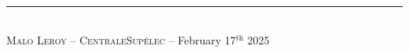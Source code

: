 \documentclass[a4paper, notitlepage]{report}
\begin{document}
\newcommand{\HRule}{\rule{\linewidth}{0.5mm}}



\thispagestyle{empty}


\thispagestyle{empty}
\setcounter{page}{0}


\renewcommand{\arraystretch}{1.5}


~
\thispagestyle{empty}
\setcounter{page}{0}
\newpage



\newpage



\newpage



\newpage



\newpage

\renewcommand{\thepage}{}


\printbibliography

\HRule \\[0.4cm]
\hfill{} \textsc{Malo \textsc{Leroy}} -- \textsc{CentraleSupélec} -- February 17${}^\text{th}$ 2025
\end{document}
